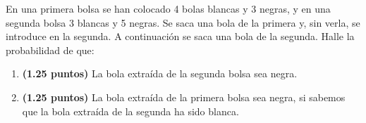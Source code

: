 
En una primera bolsa se han colocado 4 bolas blancas y 3 negras, y en una segunda bolsa 3 blancas y 5 negras. Se saca una bola de la primera y, sin verla, se introduce en la segunda. A continuación se saca una bola de la segunda. Halle la probabilidad de que:
\begin{enumerate}[label=\alph*)]
\item \textbf{(1.25 puntos)} La bola extraída de la segunda bolsa sea negra.
\item \textbf{(1.25 puntos)} La bola extraída de la primera bolsa sea negra, si sabemos que la bola extraída de la segunda ha sido blanca.
\end{enumerate}
